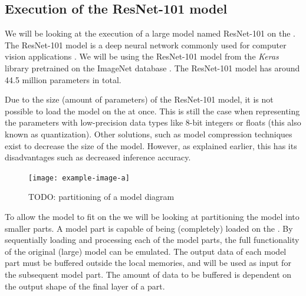 \subsection{Execution of the ResNet-101 model}
We will be looking at the execution of a large model named ResNet-101 on the \graicore{}.
The ResNet-101 model is a deep neural network commonly used for computer vision applications \autocite{heDeepResidualLearning2015}.
We will be using the ResNet-101 model from the \textit{Keras} library \cite{KerasDocumentationResNet} pretrained on the ImageNet database \cite{russakovskyImageNetLargeScale2014}.
The ResNet-101 model has around 44.5 million parameters in total.

Due to the size (amount of parameters) of the ResNet-101 model, it is not possible to load the model on the \graicore{} at once.
This is still the case when representing the parameters with low-precision data types like 8-bit integers or floats (this also known as quantization).
Other solutions, such as model compression techniques exist to decrease the size of the model.
However, as explained earlier, this has its disadvantages such as decreased inference accuracy.

\begin{figure}[hbtp]
    \centering    
    \texttt{[image: example-image-a]}
    \caption{TODO: partitioning of a model diagram}
\end{figure}

To allow the model to fit on the \graicore{} we will be looking at partitioning the model into smaller parts.
A model part is capable of being (completely) loaded on the \graicore{}.
By sequentially loading and processing each of the model parts, the full functionality of the original (large) model can be emulated.
The output data of each model part must be buffered outside the local memories, and will be used as input for the subsequent model part.
The amount of data to be buffered is dependent on the output shape of the final layer of a part.


